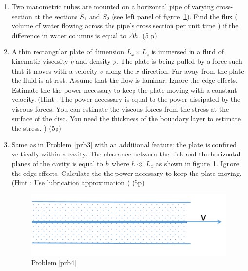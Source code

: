 \documentclass[12pt,a4paper]{article}
\begin{document}
\begin{enumerate}
\item \label{prb2} Two manometric tubes are mounted on a horizontal pipe of varying
  cross-section
  at the sections $S_1$ and $S_2$ (see left panel of figure~\ref{pipe_disc}).
  Find the flux ( volume of water flowing across the pipe's cross section per unit time )
  if the difference in water columns is equal to $\Delta h$.
  (5 p)
\item \label{prb3} A thin rectangular plate of dimension $L_x\times L_z$ 
is immersed in a fluid  of
kinematic viscosity $\nu$ and density $\rho$. The plate is being
pulled by a force such that it moves with a velocity $v$ along the $x$
direction. Far away from the plate the fluid is at rest. Assume that the flow is
  laminar. Ignore the edge effects. 
  Estimate the the power necessary to keep the plate moving with a constant velocity.
    (Hint : The power necessary
    is equal to the power dissipated by the viscous forces. You can estimate the
    viscous forces from the stress at the surface of the disc. You need the thickness
    of the boundary layer to estimate the stress. ) (5p)

\item \label{prb4} Same as in Problem~\ref{prb3} with an additional feature:
  the plate is confined vertically within a cavity. The clearance between the
  disk and the horizontal planes of the cavity is equal to $h$ where $h \ll L_x $
   as shown in figure~\ref{pipe_disc}.
   Ignore the edge effects. 
  Calculate  the the power necessary to keep the plate moving. 
    (Hint : Use lubrication approximation )  (5p)

  \begin{figure}
    \includegraphics[width=0.5\linewidth]{plate.png}
    \caption{\label{pipe_disc} Problem \ref{prb4} }
  \end{figure}



\end{enumerate}
\end{document}

